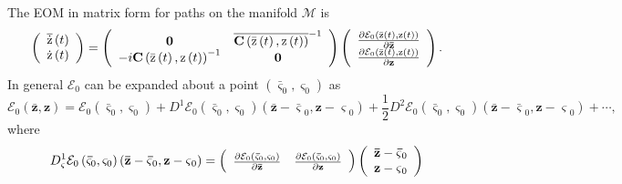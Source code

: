 \documentclass[aps,preprint]{revtex4}%
\begin{document}
The EOM in matrix form for paths on the manifold $\mathcal{M}$ is
\begin{equation}
\left(
\begin{array}
[c]{c}%
\overline{\mathrm{\dot{z}}}\left(  t\right) \\
\mathrm{\dot{z}}\left(  t\right)
\end{array}
\right)  =\left(
\begin{array}
[c]{cc}%
\mathbf{0} & \overline{\mathbf{C}\left(  \mathrm{\bar{z}}\left(  t\right)
,\mathrm{z}\left(  t\right)  \right)  }^{-1}\\
-i\mathbf{C}\left(  \mathrm{\bar{z}}\left(  t\right)  ,\mathrm{z}\left(
t\right)  \right)  ^{-1} & \mathbf{0}%
\end{array}
\right)  \left(
\begin{array}
[c]{c}%
\frac{\partial\mathcal{E}_{0}\left(  \mathrm{\bar{z}}\left(  t\right)
,\mathrm{z}\left(  t\right)  \right)  }{\partial\mathbf{\bar{z}}}\\
\frac{\partial\mathcal{E}_{0}\left(  \mathrm{\bar{z}}\left(  t\right)
,\mathrm{z}\left(  t\right)  \right)  }{\partial\mathbf{z}}%
\end{array}
\right)  .
\end{equation}
In general $\mathcal{E}_{0}$ can be expanded about a point $\left(
\mathbf{\bar{\varsigma}}_{0},\mathbf{\varsigma}_{0}\right)  $ as
\begin{equation}
\mathcal{E}_{0}\left(  \mathbf{\bar{z}},\mathbf{z}\right)  =\mathcal{E}%
_{0}\left(  \mathbf{\bar{\varsigma}}_{0},\mathbf{\varsigma}_{0}\right)
+D^{1}\mathcal{E}_{0}\left(  \mathbf{\bar{\varsigma}}_{0},\mathbf{\varsigma
}_{0}\right)  \left(  \mathbf{\bar{z}-\bar{\varsigma}}_{0},\mathbf{z-\varsigma
}_{0}\right)  +\frac{1}{2}D^{2}\mathcal{E}_{0}\left(  \mathbf{\bar{\varsigma}%
}_{0},\mathbf{\varsigma}_{0}\right)  \left(  \mathbf{\bar{z}-\bar{\varsigma}%
}_{0},\mathbf{z-\varsigma}_{0}\right)  +\cdots, \label{enex}%
\end{equation}
where
\begin{equation}
D_{\mathbf{\varsigma}}^{1}\mathcal{E}_{0}\left(  \mathbf{\bar{\varsigma}}%
_{0},\mathbf{\varsigma}_{0}\right)  \left(  \mathbf{\bar{z}-\bar{\varsigma}%
}_{0},\mathbf{z-\varsigma}_{0}\right)  =\left(
\begin{array}
[c]{cc}%
\frac{\partial\mathcal{E}_{0}\left(  \mathbf{\bar{\varsigma}}_{0}%
,\mathbf{\varsigma}_{0}\right)  }{\partial\mathbf{\bar{z}}} & \frac
{\partial\mathcal{E}_{0}\left(  \mathbf{\bar{\varsigma}}_{0},\mathbf{\varsigma
}_{0}\right)  }{\partial\mathbf{z}}%
\end{array}
\right)  \left(
\begin{array}
[c]{c}%
\mathbf{\bar{z}-\bar{\varsigma}}_{0}\\
\mathbf{z-\varsigma}_{0}%
\end{array}
\right)
\end{equation}
\end{document}
